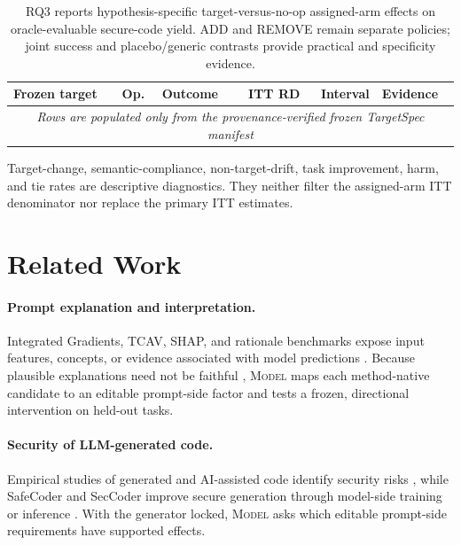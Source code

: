 \documentclass[acmsmall,screen,review,anonymous]{acmart}
\newcommand{\model}{\textsc{Model}\xspace}
\begin{document}
\begin{table}[H]
  \centering
  \small
  \caption{RQ3 reports hypothesis-specific target-versus-no-op assigned-arm
  effects on oracle-evaluable secure-code yield. ADD and REMOVE remain separate
  policies; joint success and placebo/generic contrasts provide practical and
  specificity evidence.}
  \label{tab:rq3}
  \begin{tabular}{lllrrl}
    \toprule
    Frozen target & Op. & Outcome & ITT RD & Interval & Evidence \\
    \midrule
    \multicolumn{6}{c}{\emph{Rows are populated only from the
    provenance-verified frozen TargetSpec manifest}} \\
    \bottomrule
  \end{tabular}
\end{table}

Target-change, semantic-compliance, non-target-drift, task improvement, harm,
and tie rates are descriptive diagnostics. They neither filter the assigned-arm
ITT denominator nor replace the primary ITT estimates.

\section{Related Work}

\paragraph{Prompt explanation and interpretation.}
Integrated Gradients, TCAV, SHAP, and rationale benchmarks expose input
features, concepts, or evidence associated with model predictions
\cite{sundararajan2017integrated,kim2018tcav,lundberg2017shap,deyoung2020eraser}.
Because plausible explanations need not be faithful \cite{lyu2024faithful},
\model maps each method-native candidate to an editable prompt-side factor and
tests a frozen, directional intervention on held-out tasks.

\paragraph{Security of LLM-generated code.}
Empirical studies of generated and AI-assisted code identify security risks
\cite{pearce2022copilot,perry2023assistants}, while SafeCoder and SecCoder
improve secure generation through model-side training or inference
\cite{he2024safecoder,zhang2024seccoder}. With the generator locked, \model asks
which editable prompt-side requirements have supported effects.
\end{document}
